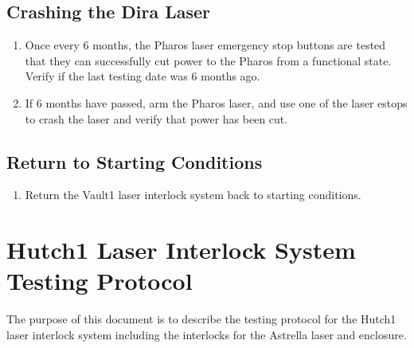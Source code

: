 \documentclass[letterpaper,10pt,english]{sphinxmanual}
\begin{document}
\subsection{Crashing the Dira Laser}
\label{\detokenize{testing_documentation/Vault-1_laser:crashing-the-dira-laser}}\begin{enumerate}
%
\item {} 
\sphinxAtStartPar
Once every 6 months, the Pharos laser emergency stop buttons are tested that they can successfully cut power to the Pharos from a functional state.
Verify if the last testing date was 6 months ago.

\item {} 
\sphinxAtStartPar
If 6 months have passed, arm the Pharos laser, and use one of the laser e\sphinxhyphen{}stops to crash the laser and verify that power has been cut.

\end{enumerate}


\subsection{Return to Starting Conditions}
\label{\detokenize{testing_documentation/Vault-1_laser:return-to-starting-conditions}}\begin{enumerate}
%
\item {} 
\sphinxAtStartPar
Return the Vault\sphinxhyphen{}1 laser interlock system back to starting conditions.

\end{enumerate}

\sphinxstepscope


\section{Hutch\sphinxhyphen{}1 Laser Interlock System Testing Protocol}
\label{\detokenize{testing_documentation/Hutch-1_laser:hutch-1-laser-interlock-system-testing-protocol}}\label{\detokenize{testing_documentation/Hutch-1_laser::doc}}
\sphinxAtStartPar
The purpose of this document is to describe the testing protocol for the Hutch\sphinxhyphen{}1 laser interlock system including the interlocks for the Astrella laser and enclosure.
\end{document}
